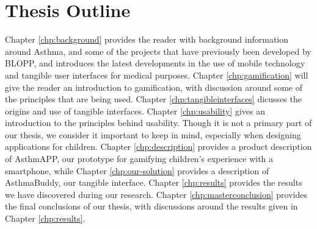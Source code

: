 \section{Thesis Outline}
Chapter \ref{chp:background} provides the reader with background information around Asthma, and some of the projects that have previously been developed by BLOPP, and introduces the latest developments in the use of mobile technology and tangible user interfaces for medical purposes. 
Chapter \ref{chp:gamification} will give the reader an introduction to gamification, with discussion around some of the principles that are being used. 
Chapter \ref{chp:tangibleinterfaces} dicusses the origins and use of tangible interfaces.
Chapter \ref{chp:usability} gives an introduction to the principles behind usability. Though it is not a primary part of our thesis, we consider it important to keep in mind, especially when designing applications for children.
Chapter \ref{chp:description} provides a product description of AsthmAPP, our prototype for gamifying children's experience with a smartphone, while Chapter \ref{chp:our-solution} provides a description of AsthmaBuddy, our tangible interface.
Chapter \ref{chp:results} provides the results we have discovered during our research.
Chapter \ref{chp:masterconclusion} provides the final conclusions of our thesis, with discussions around the results given in Chapter \ref{chp:results}.          
